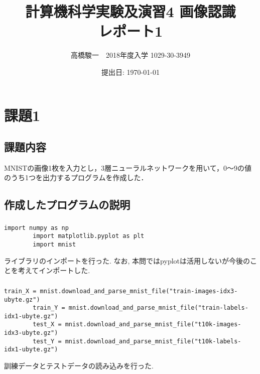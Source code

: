 \documentclass[a4j]{jarticle}
\begin{document}
\title{計算機科学実験及演習4 画像認識　\\ \bf レポート1}
\author{高橋駿一　2018年度入学 1029-30-3949}
\date{提出日: \today} %
\maketitle

\clearpage

\section*{課題1}
\subsection*{課題内容}
MNISTの画像1枚を入力とし，3層ニューラルネットワークを用いて，0～9の値のうち1つを出力するプログラムを作成した．

\subsection*{作成したプログラムの説明}
    \subsubsection*{}
        \begin{lstlisting}[caption=ライブラリのインポート,label=fuga]
        import numpy as np
        import matplotlib.pyplot as plt
        import mnist
        \end{lstlisting}
        ライブラリのインポートを行った.
        なお, 本問ではpyplotは活用しないが今後のことを考えてインポートした.

    \subsubsection*{}
        \begin{lstlisting}[caption=ライブラリのインポート,label=fuga]
        train_X = mnist.download_and_parse_mnist_file("train-images-idx3-ubyte.gz")
        train_Y = mnist.download_and_parse_mnist_file("train-labels-idx1-ubyte.gz")
        test_X = mnist.download_and_parse_mnist_file("t10k-images-idx3-ubyte.gz")
        test_Y = mnist.download_and_parse_mnist_file("t10k-labels-idx1-ubyte.gz")
        \end{lstlisting}
        訓練データとテストデータの読み込みを行った.
\end{document}
